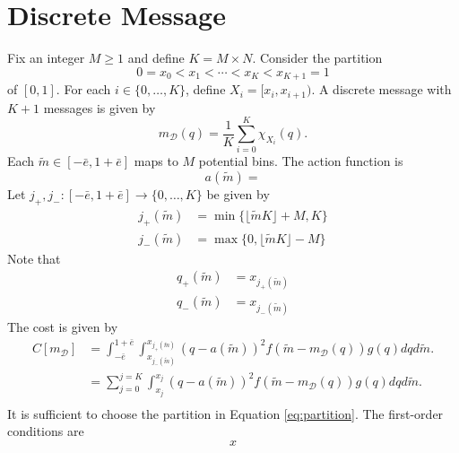 \documentclass{article}
\begin{document}
\section{Discrete Message}
Fix an integer $M\geq1$ and define $K=M\times N$. Consider the partition
\begin{equation}\label{eq:partition}
	0=x_{0}<x_{1}<\cdots<x_{K}<x_{K+1}=1
\end{equation}
of $[0,1]$. For each $i\in\{0,\ldots,K\}$, define $X_{i}=[x_{i},x_{i+1})$. A discrete message with $K+1$ messages is given by
\begin{equation}
	m_{\mathcal{D}}(q)=\frac{1}{K}\sum_{i=0}^{K}{\chi_{X_{i}}(q)}.
\end{equation}
Each $\widetilde{m}\in[-\bar{e},1+\bar{e}]$ maps to $M$ potential bins. The action function is
\begin{equation}
	a(\widetilde{m})=
\end{equation}
Let $j_{+},j_{-}:[-\bar{e},1+\bar{e}]\rightarrow\{0,\ldots,K\}$ be given by
\begin{align}
	j_{+}(\widetilde{m})&=\min\{\lfloor \widetilde{m}K\rfloor+M,K\}\\
	j_{-}(\widetilde{m})&=\max\{0,\lfloor \widetilde{m}K\rfloor-M\}
\end{align}
Note that 
\begin{align}
	q_{+}(\widetilde{m})&=x_{j_{+}(\widetilde{m})}\\
	q_{-}(\widetilde{m})&=x_{j_{-}(\widetilde{m})}
\end{align}
The cost is given by 
\begin{align}
	C[m_{\mathcal{D}}]&=\int_{-\bar{e}}^{1+\bar{e}}{\int_{x_{j_{-}(\widetilde{m})}}^{x_{j_{+}(\widetilde{m})}}{(q-a(\widetilde{m}))^{2}f(\widetilde{m}-m_{\mathcal{D}}(q))g(q)dq}d\widetilde{m}}.\\
	&=\sum_{j=0}^{j=K}{\int_{x_{j}}^{x_{j}}{(q-a(\widetilde{m}))^{2}f(\widetilde{m}-m_{\mathcal{D}}(q))g(q)dq}d\widetilde{m}}.\\
\end{align}
It is sufficient to choose the partition in Equation \ref{eq:partition}. The first-order conditions are
\begin{equation}
	x
\end{equation}
\end{document}
